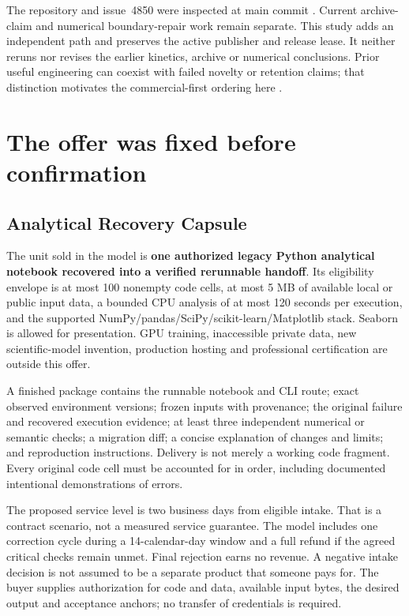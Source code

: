 The repository and issue~4850 were inspected at main commit . Current archive-claim and numerical boundary-repair work remain separate. This study adds an independent path and preserves the active publisher and release lease. It neither reruns nor revises the earlier kinetics, archive or numerical conclusions. Prior useful engineering can coexist with failed novelty or retention claims; that distinction motivates the commercial-first ordering here \citep{coordination,publication}.

\section{The offer was fixed before confirmation}
\subsection{Analytical Recovery Capsule}
The unit sold in the model is \textbf{one authorized legacy Python analytical notebook recovered into a verified rerunnable handoff}. Its eligibility envelope is at most 100 nonempty code cells, at most 5 MB of available local or public input data, a bounded CPU analysis of at most 120 seconds per execution, and the supported NumPy/pandas/SciPy/scikit-learn/Matplotlib stack. Seaborn is allowed for presentation. GPU training, inaccessible private data, new scientific-model invention, production hosting and professional certification are outside this offer.

A finished package contains the runnable notebook and CLI route; exact observed environment versions; frozen inputs with provenance; the original failure and recovered execution evidence; at least three independent numerical or semantic checks; a migration diff; a concise explanation of changes and limits; and reproduction instructions. Delivery is not merely a working code fragment. Every original code cell must be accounted for in order, including documented intentional demonstrations of errors.

The proposed service level is two business days from eligible intake. That is a contract scenario, not a measured service guarantee. The model includes one correction cycle during a 14-calendar-day window and a full refund if the agreed critical checks remain unmet. Final rejection earns no revenue. A negative intake decision is not assumed to be a separate product that someone pays for. The buyer supplies authorization for code and data, available input bytes, the desired output and acceptance anchors; no transfer of credentials is required.

